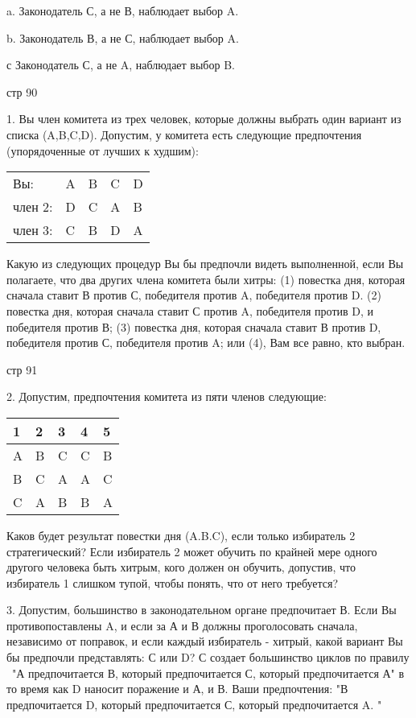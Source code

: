 \documentclass[a4paper,12pt]{article}
\begin{document}
a. Законодатель С, а не В, наблюдает выбор A.

b. Законодатель В, а не С, наблюдает выбор A.

с Законодатель С, а не A, наблюдает выбор B.

стр 90

1. Вы член комитета из трех человек, которые должны
выбрать один вариант из списка (A,B,C,D). Допустим,
у комитета есть следующие предпочтения
(упорядоченные от лучших к худшим):

\begin{tabular}{lllll}
Вы: & A & B & C & D \\ член 2: & D & C & A & B \\
член 3: & C & B & D & A\end{tabular}

Какую из следующих процедур Вы бы предпочли видеть
выполненной, если Вы полагаете, что два других
члена комитета были хитры: (1) повестка дня,
которая сначала ставит В против С, победителя
против A, победителя против D. (2) повестка дня,
которая сначала ставит С против A, победителя
против D, и победителя против В; (3) повестка дня,
которая сначала ставит В против D, победителя
против С, победителя против A; или (4), Вам все
равно, кто выбран.

стр 91

2. Допустим, предпочтения комитета из пяти членов
следующие:

\begin{tabular}{|lllll|}
\hline 1 & 2 & 3 & 4 & 5 \\ \hline A & B & C & C &
B \\ B & C & A & A & C \\ C & A & B & B & A \\
\hline
\end{tabular}

Каков будет результат повестки дня (A.B.C), если
только избиратель 2 стратегический? Если избиратель
2 может обучить по крайней мере одного другого
человека быть хитрым, кого должен он обучить,
допустив, что избиратель 1 слишком тупой, чтобы
понять, что от него требуется?

3. Допустим, большинство в законодательном органе
предпочитает В. Если Вы противопоставлены A, и если
за А и В должны проголосовать сначала, независимо
от поправок, и если каждый избиратель - хитрый,
какой вариант Вы бы предпочли представлять: С или
D? С создает большинство циклов по правилу \ "А
предпочитается В, который предпочитается С, который
предпочитается А" в то время как D наносит
поражение и А, и В. Ваши предпочтения: "В
предпочитается D, который предпочитается С, который
предпочитается A. "
\end{document}
